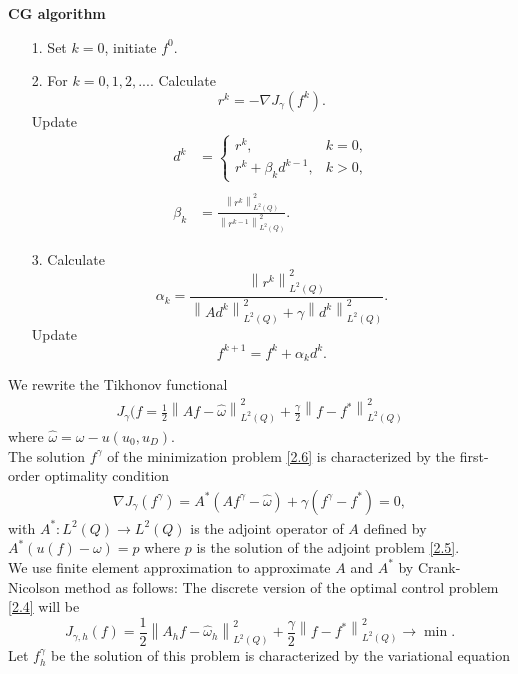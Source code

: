 \documentclass[notitlepage,a4paper,fleqn,9pt]{icmfarticle}
\begin{document}
\begin{multicols}{2}
\noindent \textbf{CG algorithm}
\begin{itemize}
	\item[1.] Set $k=0$, initiate $f^0$.
	\item[2.] For $k=0, 1, 2,...$. Calculate
	$$r^k=-\nabla J_\gamma(f^k).$$
	Update\\
	\begin{align*}
	d^k&=\left\{\begin{array}{ll}
	r^k,& k=0,\\
	r^k+\beta_kd^{k-1},& k>0,
	\end{array}\right.\\\\
	\beta_k&=\frac{\left\|r^k\right\|^2_{L^2(Q)}}{\left\|r^{k-1}\right\|^2_{L^2(Q)}}.
	\end{align*}
	\item[3.] Calculate
	$$\alpha_k=\frac{\left\|r^k\right\|^2_{L^2(Q)}}{\displaystyle\left\|Ad^k\right\|^2_{L^2(Q)}+\gamma\left\|d^k\right\|^2_{L^2(Q)}}.$$
	Update
	$$f^{k+1}=f^{k}+\alpha_kd^k.$$
\end{itemize}
We rewrite the Tikhonov functional
\begin{align}
	J_\gamma(f=\frac{1}{2}\left\|Af-\hat{\omega}\right\|^2_{L^2(Q)}+\frac{\gamma}{2}\left\|f-f^*\right\|^2_{L^2(Q)}
\end{align}
where $\hat{\omega}=\omega- u(u_0, u_D)$.
\\
The solution $f^\gamma$ of the minimization problem \eqref{2.6} is characterized by the first-order optimality condition
\begin{align}\label{2.10}
	\nabla J_\gamma(f^\gamma)= A^*(Af^\gamma-\hat{\omega})+\gamma(f^\gamma-f^*)=0,
\end{align}
with $A^*: L^2(Q)\to L^2(Q)$ is the adjoint operator of $A$ defined by $A^*\left( u(f) - \omega\right) = p$ where $p$ is the solution of the adjoint problem \eqref{2.5}. 
\\
We use finite element approximation to approximate $A$ and $A^*$ by Crank-Nicolson method as follows: The discrete version of the optimal control problem \eqref{2.4} will be
$$J_{\gamma, h}(f)=\frac{1}{2}\left\|A_hf-\hat{\omega}_h\right\|^2_{L^2(Q)}+\frac{\gamma}{2}\left\|f-f^*\right\|^2_{L^2(Q)}\to \min.$$
Let $f^\gamma_h$ be the solution of this problem is characterized by the variational equation

\end{multicols}
\end{document}
